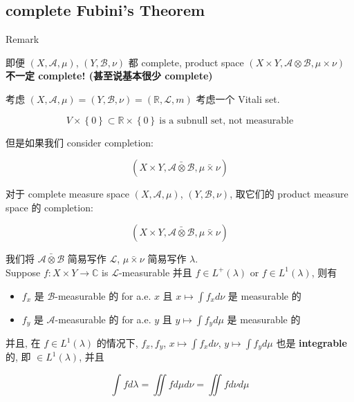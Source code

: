 \subsection{complete Fubini's Theorem}\label{complete-fubinis-theorem}

\begin{qlremark}{Remark}

即便 \((X,\mathcal{A},\mu)\), \((Y,\mathcal{B},\nu)\) 都 complete, product space \((X \times Y,\mathcal{A} \otimes \mathcal{B},\mu \times \nu)\) \textbf{不一定 complete! (甚至说基本很少 complete)}

\end{qlremark}

\begin{example}

考虑 \((X,\mathcal{A},\mu) = (Y,\mathcal{B},\nu) = (\mathbb{R},\mathcal{L},m)\) 考虑一个 Vitali set.

\[V \times \left\{ 0 \right\} \subset \mathbb{R} \times \left\{ 0 \right\}\ \text{is a subnull set, not measurable}\]

\end{example}

但是如果我们 consider completion:

\[(X \times Y,\bar{\mathcal{A}\otimes\mathcal{B}},\bar{\mu\times\nu})\]

\begin{theorem}{}

对于 complete measure space \((X,\mathcal{A},\mu)\), \((Y,\mathcal{B},\nu)\), 取它们的 product measure space 的 completion:

\[(X \times Y,\bar{\mathcal{A}\otimes\mathcal{B}},\bar{\mu\times\nu})\]

我们将 \(\bar{\mathcal{A}\otimes\mathcal{B}}\) 简易写作 \(\mathcal{L}\), \(\bar{\mu\times\nu}\) 简易写作 \(\lambda\).\\
Suppose \(f:X \times Y\rightarrow\mathbb{C}\) is \(\mathcal{L}\)-measurable 并且 \(f \in L^{+}(\lambda)\) or \(f \in L^{1}(\lambda)\), 则有

\begin{itemize}
\item
  \(f_{x}\) 是 \(\mathcal{B}\)-measurable 的 for a.e. \(x\) 且 \(x\mapsto\int f_{x} d\nu\) 是 measurable 的
\item
  \(f_{y}\) 是 \(\mathcal{A}\)-measurable 的 for a.e. \(y\) 且 \(y\mapsto\int f_{y} d\mu\) 是 measurable 的
\end{itemize}

并且, 在 \(f \in L^{1}(\lambda)\) 的情况下, \(f_{x},f_{y}\), \(x\mapsto\int f_{x} d\nu\), \(y\mapsto\int f_{y} d\mu\) 也是 \textbf{integrable} 的, 即 \(\in L^{1}(\lambda)\), 并且

\[\int f d\lambda = \iint f d\mu d\nu = \iint f d\nu d\mu\]

\end{theorem}

